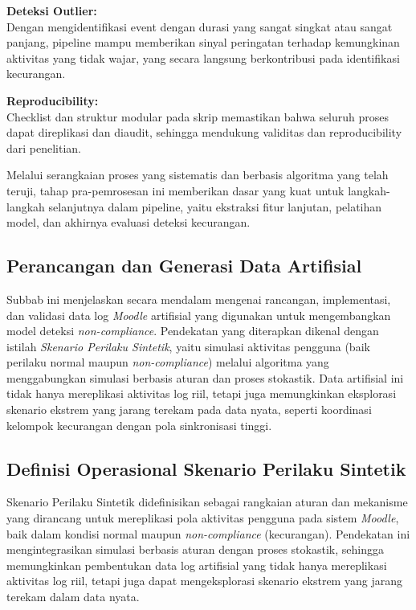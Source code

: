 \textbf{Deteksi Outlier:} \\
Dengan mengidentifikasi event dengan durasi yang sangat singkat atau sangat panjang, pipeline mampu memberikan sinyal peringatan terhadap kemungkinan aktivitas yang tidak wajar, yang secara langsung berkontribusi pada identifikasi kecurangan.

\textbf{Reproducibility:} \\
Checklist dan struktur modular pada skrip memastikan bahwa seluruh proses dapat direplikasi dan diaudit, sehingga mendukung validitas dan reproducibility dari penelitian.

Melalui serangkaian proses yang sistematis dan berbasis algoritma yang telah teruji, tahap pra-pemrosesan ini memberikan dasar yang kuat untuk langkah-langkah selanjutnya dalam pipeline, yaitu ekstraksi fitur lanjutan, pelatihan model, dan akhirnya evaluasi deteksi kecurangan.

\subsection{Perancangan dan Generasi Data Artifisial}
\label{sec:perancanganGenerasiDataArtifisial}
Subbab ini menjelaskan secara mendalam mengenai rancangan, implementasi, dan validasi data log \textit{Moodle} artifisial yang digunakan untuk mengembangkan model deteksi \textit{non-compliance}. Pendekatan yang diterapkan dikenal dengan istilah \textit{Skenario Perilaku Sintetik}, yaitu simulasi aktivitas pengguna (baik perilaku normal maupun \textit{non-compliance}) melalui algoritma yang menggabungkan simulasi berbasis aturan dan proses stokastik. Data artifisial ini tidak hanya mereplikasi aktivitas log riil, tetapi juga memungkinkan eksplorasi skenario ekstrem yang jarang terekam pada data nyata, seperti koordinasi kelompok kecurangan dengan pola sinkronisasi tinggi.

\subsection{Definisi Operasional Skenario Perilaku Sintetik}
\label{sec:definisiOperasionalSkenarioPerilakuSintetik}
Skenario Perilaku Sintetik didefinisikan sebagai rangkaian aturan dan mekanisme yang dirancang untuk mereplikasi pola aktivitas pengguna pada sistem \textit{Moodle}, baik dalam kondisi normal maupun \textit{non-compliance} (kecurangan). Pendekatan ini mengintegrasikan simulasi berbasis aturan dengan proses stokastik, sehingga memungkinkan pembentukan data log artifisial yang tidak hanya mereplikasi aktivitas log riil, tetapi juga dapat mengeksplorasi skenario ekstrem yang jarang terekam dalam data nyata.

